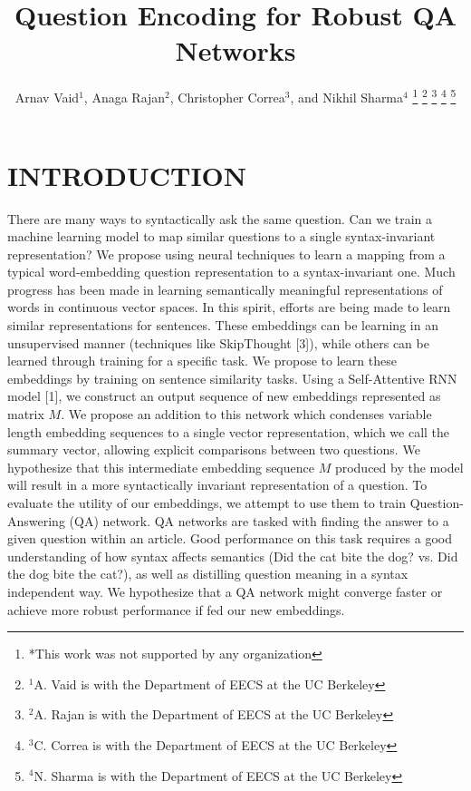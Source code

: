 \documentclass[a4paper, 11pt]{article}
\title{\LARGE \bf
Question Encoding for Robust QA Networks
}
\author{Arnav Vaid$^{1}$, Anaga Rajan$^{2}$, Christopher Correa$^{3}$, and Nikhil Sharma$^{4}$%
\thanks{*This work was not supported by any organization}%
\thanks{$^{1}$A. Vaid is with the Department of EECS at the UC Berkeley}%
\thanks{$^{2}$A. Rajan is with the Department of EECS at the UC Berkeley}%
\thanks{$^{3}$C. Correa is with the Department of EECS at the UC Berkeley}%
\thanks{$^{4}$N. Sharma is with the Department of EECS at the UC Berkeley}%
}
\begin{document}
\maketitle
\thispagestyle{empty}
\pagestyle{empty}




\section{INTRODUCTION}
There are many ways to syntactically ask the same question. Can we train a machine learning model to map similar questions to a single syntax-invariant representation? We propose using neural techniques to learn a mapping from a typical word-embedding question representation to a syntax-invariant one. \newline\newline
Much progress has been made in learning semantically meaningful representations of words in continuous vector spaces. In this spirit, efforts are being made to learn similar representations for sentences. These embeddings can be learning in an unsupervised manner (techniques like SkipThought [3]), while others can be learned through training for a specific task. \newline\newline
We propose to learn these embeddings by training on sentence similarity tasks. Using a Self-Attentive RNN model [1], we construct an output sequence of new embeddings represented as matrix $M$. We propose an addition to this network which condenses variable length embedding sequences to a single vector representation, which we call the summary vector, allowing explicit comparisons between two questions. We hypothesize that this intermediate embedding sequence $M$ produced by the model will result in a more syntactically invariant representation of a question. \newline\newline
To evaluate the utility of our embeddings, we attempt to use them to train Question-Answering (QA) network. QA networks are tasked with finding the answer to a given question within an article. Good performance on this task requires a good understanding of how syntax affects semantics (Did the cat bite the dog? vs. Did the dog bite the cat?), as well as distilling question meaning in a syntax independent way. We hypothesize that a QA network might converge faster or achieve more robust performance if fed our new embeddings. \newline\newline
\end{document}
